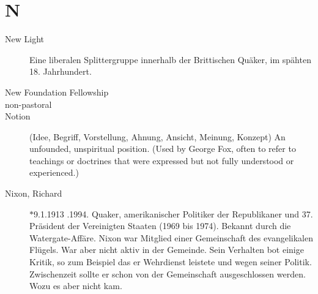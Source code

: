 \section*{N}

\articlesize

\begin{description}

\item[New Light] Eine liberalen Splittergruppe innerhalb der Brittischen Quäker,
im spähten 18. Jahrhundert.


 \item[New Foundation Fellowship]

\item[non-pastoral] 

\item[Notion] (Idee, Begriff, Vorstellung, Ahnung, Ansicht, Meinung, Konzept)
    An unfounded, unspiritual position. (Used by George Fox, often to refer to teachings or doctrines that were expressed but not fully understood or experienced.)

\item[Nixon, Richard] $\ast$9.1.1913 .1994. Quaker, amerikanischer
Politiker der Republikaner und 37. Präsident der Vereinigten Staaten (1969
bis 1974). Bekannt durch die Watergate-Affäre. Nixon war Mitglied einer
Gemeinschaft des evangelikalen Flügels. War aber nicht aktiv in der Gemeinde.
Sein Verhalten bot einige Kritik, so zum Beispiel das er Wehrdienst leistete
und wegen seiner Politik. Zwischenzeit sollte er schon von der Gemeinschaft
ausgeschlossen werden. Wozu es aber nicht kam. 


\end{description}
